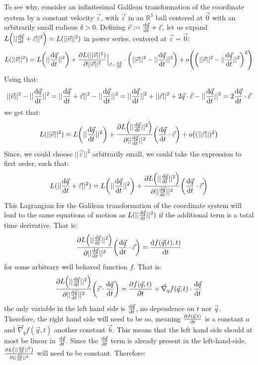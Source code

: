 \documentclass[11pt, a4paper]{article} %
\newcommand{\R}{\mathbb{R}} %
\begin{document}
To see why, consider an infinitesimal Galilean transformation of the coordinate system by a constant velocity $\vec{\varepsilon}$, with $\vec{\varepsilon}$ in an $\R^3$ ball centered at $\vec{0}$ with an arbitrarily small radious $\delta>0$. Defining $\vec{v}:=\dv{\vec{q}}{t}+\vec{\varepsilon}$, let us expand $L\qty( ||\dv{\vec{q}}{t}+\vec{\varepsilon}||^2)=L(||\vec{v}||^2)$ in power series, centered at $\vec{\varepsilon}=\vec{0}$:
\begin{equation}
L(||\vec{v}||^2)=L\qty(||\dv{\vec{q}}{t}||^2)+\pdv{L(||\vec{v}||^2)}{||\vec{v}||^2}\Big\rvert_{\vec{v}=\dv{\vec{q}}{t}}\cdot\qty(||\vec{v}||^2-||\dv{\vec{q}}{t}||^2)+o\qty(\qty(||\vec{v}||^2-||\dv{\vec{q}}{t}||^2)^2  )
\end{equation}
Using that:
\begin{equation}
||\vec{v}||^2-||\dv{\vec{q}}{t}||^2=||\dv{\vec{q}}{t}+\vec{\varepsilon}||^2-||\dv{\vec{q}}{t}||^2=||\dv{\vec{q}}{t}||^2+||\vec{\varepsilon}||^2+2\vec{q}\cdot \vec{\varepsilon}-||\dv{\vec{q}}{t}||^2=2\dv{\vec{q}}{t}\cdot \vec{\varepsilon}
\end{equation}
we get that:
\begin{equation}
L(||\vec{v}||^2)=L\qty(||\dv{\vec{q}}{t}||^2)+\pdv{L\qty(||\dv{\vec{q}}{t}||^2)}{||\dv{\vec{q}}{t}||^2}\qty(\dv{\vec{q}}{t}\cdot \vec{\varepsilon})+o\qty((||\vec{\varepsilon}||)^2  )
\end{equation}
Since, we could choose $||\vec{\varepsilon}||^2$ arbitrarily small, we could take the expression to first order, such that:
\begin{equation}
L(||\dv{\vec{q}}{t}+\vec{\varepsilon}||^2)=L\qty(||\dv{\vec{q}}{t}||^2)+\pdv{L\qty(||\dv{\vec{q}}{t}||^2)}{||\dv{\vec{q}}{t}||^2}\qty(\dv{\vec{q}}{t}\cdot \vec{\varepsilon})
\end{equation}
This Lagrangian for the Galilean transformation of the coordinate system will lead to the same equations of motion as $L(||\dv{\vec{q}}{t}||^2)$ if the additional term is a total time derivative. That is:
\begin{equation}
\pdv{L\qty(||\dv{\vec{q}}{t}||^2)}{||\dv{\vec{q}}{t}||^2}\qty(\dv{\vec{q}}{t}\cdot \vec{\varepsilon})=\dv{f(\vec{q}(t),t)}{t}
\end{equation}
for some arbitrary well behaved function $f$. That is:
$$
\pdv{L\qty(||\dv{\vec{q}}{t}||^2)}{||\dv{\vec{q}}{t}||^2}\qty( \vec{\varepsilon}\cdot \dv{\vec{q}}{t})=\pdv{f(\vec{q},t)}{t}+\vec{\nabla}_qf(\vec{q},t)\cdot \dv{\vec{q}}{t}
$$
the only variable in the left hand side is $\dv{\vec{q}}{t}$, no dependence on $t$ nor $\vec{q}$. Therefore, the right hand side will need to be so, meaning $\pdv{f(\vec{q},t)}{t}$ is a constant $a$ and $\vec{\nabla}_qf(\vec{q},t)$ another constant $\vec{b}$. This means that the left hand side should at most be linear in $\dv{\vec{q}}{t}$. Since the $\dv{\vec{q}}{t}$ term is already present in the left-hand-side, $\pdv{L\qty(||\dv{\vec{q}}{t}||^2)}{||\dv{\vec{q}}{t}||^2}$ will need to be constant. Therefore:
\end{document}

